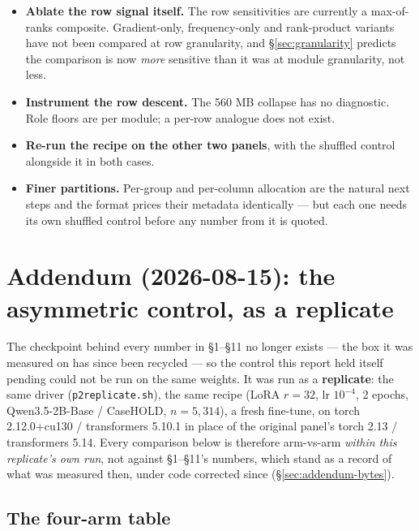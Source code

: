 \documentclass[11pt]{article}
\newcommand{\code}[1]{\texttt{#1}}
\begin{document}
\begin{itemize}[leftmargin=1.4em]
\item \textbf{Ablate the row signal itself.} The row sensitivities are currently a
max-of-ranks composite. Gradient-only, frequency-only and rank-product variants have not been
compared at row granularity, and \S\ref{sec:granularity} predicts the comparison is now
\emph{more} sensitive than it was at module granularity, not less.
\item \textbf{Instrument the row descent.} The 560 MB collapse has no diagnostic. Role floors are
per module; a per-row analogue does not exist.
\item \textbf{Re-run the recipe on the other two panels}, with the shuffled control alongside it in
both cases.
\item \textbf{Finer partitions.} Per-group and per-column allocation are the natural next steps and
the format prices their metadata identically --- but each one needs its own shuffled control before
any number from it is quoted.
\end{itemize}

\section{Addendum (2026-08-15): the asymmetric control, as a replicate}
\label{sec:addendum}

The checkpoint behind every number in \S1--\S11 no longer exists --- the box it was measured on
has since been recycled --- so the control this report held itself pending could not be run on
the same weights. It was run as a \textbf{replicate}: the same driver
(\code{p2replicate.sh}), the same recipe (LoRA $r=32$, lr $10^{-4}$, 2 epochs, Qwen3.5-2B-Base /
CaseHOLD, $n = 5{,}314$), a fresh fine-tune, on torch 2.12.0+cu130 / transformers 5.10.1 in place
of the original panel's torch 2.13 / transformers 5.14. Every comparison below is therefore
arm-vs-arm \emph{within this replicate's own run}, not against \S1--\S11's numbers, which stand
as a record of what was measured then, under code corrected since (\S\ref{sec:addendum-bytes}).

\subsection{The four-arm table}
\end{document}
